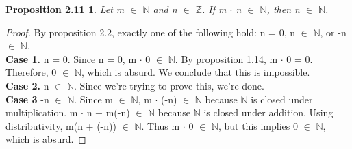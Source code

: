 \documentclass[12pt]{amsart}
\newcommand{\N}{\mathbb{N}}
\newcommand{\Z}{\mathbb{Z}}
\begin{document}
\newtheorem*{prop2.11}{Proposition 2.11}
\begin{prop2.11}
Let m $\in$ $\N$ and n $\in$ $\Z$. If m $\cdot$ n $\in$ $\N$, then n $\in$ $\N$.
\end{prop2.11}
\begin{proof}
	By proposition 2.2, exactly one of the following hold: n = 0, n $\in$ $\N$, or -n$\in$ $\N$. 
	\\\textbf{Case 1.} n = 0. Since n = 0, m $\cdot$ 0 $\in$ $\N$. By proposition 1.14, m $\cdot$ 0 = 0. Therefore, 0 $\in$ $\N$, which is absurd. We conclude that this is impossible.
	\\\textbf{Case 2.} n $\in$ $\N$. Since we're trying to prove this, we're done.
	\\\textbf{Case 3} -n $\in$ $\N$. Since m $\in$ $\N$, m $\cdot$ (-n) $\in$ $\N$ because $\N$ is closed under multiplication. m $\cdot$ n + m(-n) $\in$ $\N$ because $\N$ is closed under addition. Using distributivity, m(n + (-n)) $\in$ $\N$. Thus m $\cdot$ 0 $\in$ $\N$, but this implies 0 $\in$ $\N$, which is absurd.
\end{proof}
\end{document}
